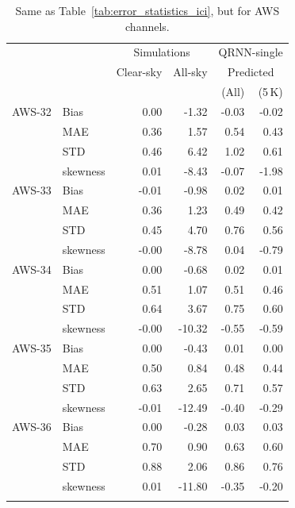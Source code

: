 \documentclass[amt, manuscript]{copernicus}
\begin{document}
\begin{table}[t]
	\caption{Same as Table~\ref{tab:error_statistics_ici}, but for AWS channels. }
	\label{tab:statistics_qrnn_aws}
	\begin{tabular}{llrr|rr}
		\tophline
		&&\multicolumn{2}{c|}{Simulations}& \multicolumn{2}{c}{QRNN-single} \\
		\cline{3-6}
		&&Clear-sky &   All-sky &  \multicolumn{2}{c}{Predicted}  \\
		&&   &    &   (All) & (5\,K) \\
		\middlehline
		AWS-32  &Bias     & 0.00 & -1.32 &  -0.03 & -0.02 \\
		&MAE      & 0.36 &  1.57 &   0.54 &  0.43 \\
		&STD      & 0.46 &  6.42 &   1.02 &  0.61 \\
		&skewness & 0.01 & -8.43 &  -0.07 & -1.98 \\
		\middlehline
		AWS-33	&Bias     & -0.01 & -0.98 &  0.02 &  0.01 \\
		&MAE      &  0.36 &  1.23 &  0.49 &  0.42 \\
		&STD      &  0.45 &  4.70 &  0.76 &  0.56 \\
		&skewness & -0.00 & -8.78 &  0.04 & -0.79 \\
		
		\middlehline
		AWS-34	&Bias     &  0.00 &  -0.68 &  0.02 &  0.01 \\
		&MAE      &  0.51 &   1.07 &  0.51 &  0.46 \\
		&STD      &  0.64 &   3.67 &  0.75 &  0.60 \\
		&skewness & -0.00 & -10.32 & -0.55 & -0.59 \\
		\middlehline
		AWS-35	&Bias     &  0.00 &  -0.43 &  0.01 &  0.00 \\
		&MAE      &  0.50 &   0.84 &  0.48 &  0.44 \\
		&STD      &  0.63 &   2.65 &  0.71 &  0.57 \\
		&skewness & -0.01 & -12.49 & -0.40 & -0.29 \\
		\middlehline
		AWS-36  &Bias     & 0.00 &  -0.28 &   0.03  &  0.03 \\
		&MAE      & 0.70 &   0.90 &   0.63  &  0.60 \\
		&STD      & 0.88 &   2.06 &   0.86  &  0.76 \\
		&skewness & 0.01 & -11.80 &  -0.35  & -0.20 \\
		\bottomhline				
	\end{tabular}
	\belowtable{} %
\end{table}
\end{document}
